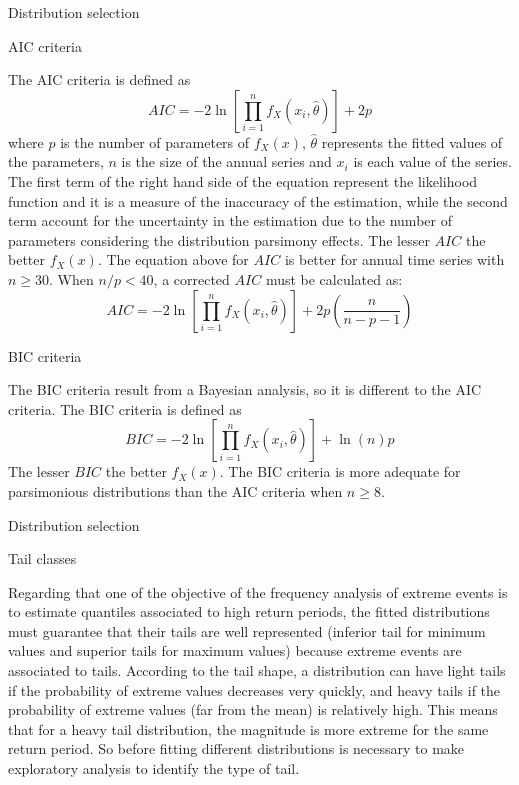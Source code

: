 \documentclass[8pt]{beamer}
\renewcommand{\emph}[1]{\textcolor{myorange}{#1}}
\begin{document}
\begin{frame}{Distribution selection}
    \begin{block}{AIC  criteria}
    \end{block}
    \vspace{-3pt}
    The \alert{AIC} criteria is defined as
    \vspace{-3pt}
    \[
        AIC = -2 \ln \left[ \prod_{i=1}^n f_X (x_i, \hat{\theta}) \right] + 2p
    \]
    where $p$ is the number of parameters of $f_X (x)$, $\hat{\theta}$ represents the fitted values of the parameters, $n$ is the size of the annual series and $x_i$ is each value of the series. The first term of the right hand side of the equation represent the likelihood  function and it is a measure of the inaccuracy of the estimation, while the second term account for the uncertainty in the estimation due to the number of parameters considering the distribution parsimony effects. The lesser $AIC$ the better $f_X (x)$. The equation above for $AIC$ is better for annual time series with $n\geq 30$. When $n/p < 40$, a corrected $AIC$  must be calculated as:
    \vspace{-3pt}
    \[
        AIC = -2 \ln \left[ \prod_{i=1}^n f_X (x_i, \hat{\theta}) \right] + 2p\left(\frac{n}{n-p-1}\right)
    \]
    \begin{block}{BIC criteria}
    \end{block}
    \vspace{-3pt}
    The \alert{BIC} criteria result from a Bayesian analysis, so it is different to the \emph{AIC criteria}. The \emph{BIC criteria} is defined as
    \vspace{-3pt}
    \[
        BIC = -2 \ln \left[ \prod_{i=1}^n f_X (x_i, \hat{\theta}) \right] + \ln(n)p
    \]
    The lesser $BIC$ the better $f_X (x)$. The \emph{BIC criteria} is more adequate for parsimonious distributions than the \emph{AIC criteria} when $n\geq 8$.


\end{frame}

\begin{frame}{Distribution selection}
    \begin{block}{Tail classes}
    \end{block}
    Regarding that one of the objective of the frequency analysis of extreme events is to estimate \emph{quantiles} associated to high return periods, the fitted distributions must guarantee that their tails are well represented (inferior tail for minimum values and superior tails for maximum values) because extreme events are associated to  tails. According to the tail shape, a distribution can have \alert{light tails} if the probability of extreme values decreases very quickly, and \alert{heavy tails} if the probability of extreme values (far from the mean) is relatively high. This means that for a \emph{heavy tail} distribution, the magnitude is more extreme for the same return period. So before fitting different  distributions is necessary  to make exploratory analysis to identify the type of tail. 
\end{frame}
\end{document}
